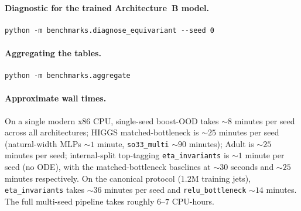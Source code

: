 \documentclass[11pt]{article}
\begin{document}
\paragraph{Diagnostic for the trained Architecture~B model.}
\begin{verbatim}
python -m benchmarks.diagnose_equivariant --seed 0
\end{verbatim}

\paragraph{Aggregating the tables.}
\begin{verbatim}
python -m benchmarks.aggregate
\end{verbatim}

\paragraph{Approximate wall times.} On a single modern x86 CPU,
single-seed boost-OOD takes $\sim 8$ minutes per seed across all
architectures; HIGGS matched-bottleneck is $\sim 25$ minutes per seed
(natural-width MLPs $\sim 1$ minute, \texttt{so33\_multi} $\sim 90$
minutes); Adult is $\sim 25$ minutes per seed; internal-split
top-tagging \texttt{eta\_invariants} is $\sim 1$ minute per seed (no
ODE), with the matched-bottleneck baselines at $\sim 30$ seconds and
$\sim 25$ minutes respectively. On the canonical protocol
($1.2$M training jets), \texttt{eta\_invariants} takes $\sim 36$
minutes per seed and \texttt{relu\_bottleneck} $\sim 14$ minutes. The
full multi-seed pipeline takes roughly $6$--$7$ CPU-hours.
\end{document}
